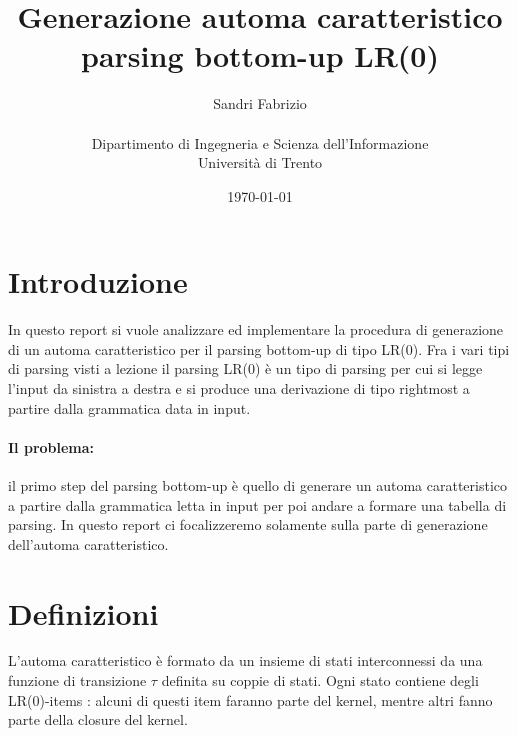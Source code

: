 \documentclass[12pt]{article}
\title{Generazione automa caratteristico parsing bottom-up LR(0) }
\author{
        Sandri Fabrizio \\ \\        
        Dipartimento di Ingegneria e Scienza dell'Informazione\\
        Università di Trento
}
\date{\today}
\begin{document}
\maketitle

\section{Introduzione}
In questo report si vuole analizzare ed implementare la procedura di generazione di un automa caratteristico per il parsing bottom-up di tipo LR(0). Fra i vari tipi di parsing visti a lezione il parsing LR(0) è un tipo di parsing per cui si legge l'input da sinistra a destra e si produce una derivazione di tipo rightmost a partire dalla grammatica data in input.

\paragraph{Il problema:} 
il primo step del parsing bottom-up è quello di generare un automa caratteristico a partire dalla grammatica letta in input per poi andare a formare una tabella di parsing. In questo report ci focalizzeremo solamente sulla parte di generazione dell'automa caratteristico.

\section{Definizioni}
L'automa caratteristico è formato da un insieme di stati interconnessi da una funzione di transizione $\tau$ definita su coppie di stati. 
Ogni stato contiene degli LR(0)-items : alcuni di questi item faranno parte del kernel, mentre altri fanno parte della closure del kernel.\\
\end{document}
